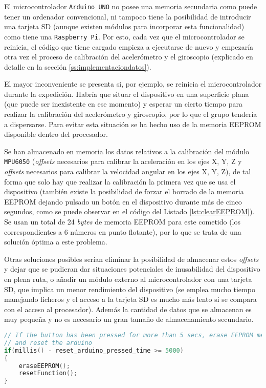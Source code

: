 El microcontrolador \texttt{Arduino UNO} no posee una memoria secundaria como puede tener un ordenador convencional, ni tampoco tiene la posibilidad de introducir una tarjeta \ac{SD} (aunque existen módulos para incorporar esta funcionalidad) como tiene una \texttt{Raspberry Pi}. Por esto, cada vez que el microcontrolador se reinicia, el código que tiene cargado empieza a ejecutarse de nuevo y empezaría otra vez el proceso de calibración del acelerómetro y el giroscopio (explicado en detalle en la sección \ref{ss:implementaciondatos}).

El mayor inconveniente se presenta si, por ejemplo, se reinicia el microcontrolador durante la expedición. Habría que situar el dispositivo en una superficie plana (que puede ser inexistente en ese momento) y esperar un cierto tiempo para realizar la calibración del acelerómetro y giroscopio, por lo que el grupo tendería a dispersarse. Para evitar esta situación se ha hecho uso de la memoria \ac{EEPROM} disponible dentro del procesador. 

Se han almacenado en memoria los datos relativos a la calibración del módulo \texttt{MPU6050} (\textit{offsets} necesarios para calibrar la aceleración en los ejes X, Y, Z y \textit{offsets} necesarios para calibrar la velocidad angular en los ejes X, Y, Z), de tal forma que solo hay que realizar la calibración la primera vez que se usa el dispositivo (también existe la posibilidad de forzar el borrado de la memoria \ac{EEPROM} dejando pulsado un botón en el dispositivo durante más de cinco segundos, como se puede observar en el código del Listado \ref{lst:clearEEPROM}). Se usan un total de 24 \textit{bytes} de memoria \ac{EEPROM} para este cometido (los correspondientes a 6 números en punto flotante), por lo que se trata de una solución óptima a este problema. 

Otras soluciones posibles serían eliminar la posibilidad de almacenar estos \textit{offsets} y dejar que se pudieran dar situaciones potenciales de inusabilidad del dispositivo en plena ruta, o añadir un módulo externo al microcontrolador con una tarjeta \ac{SD}, que implica un menor rendimiento del dispositivo (se emplea mucho tiempo manejando ficheros y el acceso a la tarjeta \ac{SD} es mucho más lento si se compara con el acceso al procesador). Además la cantidad de datos que se almacenan es muy pequeña y no es necesario un gran tamaño de almacenamiento secundario.

\begin{lstlisting}[language=c++,captionpos=t,caption={\textbf{Borrado de la memoria \ac{EEPROM} cuando se deja pulsado un botón durante más de 5 segundos.}},label={lst:clearEEPROM}]
// If the button has been pressed for more than 5 secs, erase EEPROM memory
// and reset the arduino
if(millis() - reset_arduino_pressed_time >= 5000)
{
    eraseEEPROM();
    resetFunction();
}
\end{lstlisting}

